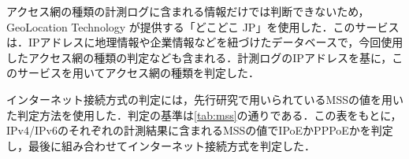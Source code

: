 アクセス網の種類の計測ログに含まれる情報だけでは判断できないため，GeoLocation Technology が提供する「どこどこ JP」を使用した．このサービスは．IPアドレスに地理情報や企業情報などを紐づけたデータベースで，今回使用したアクセス網の種類の判定なども含まれる．計測ログのIPアドレスを基に，このサービスを用いてアクセス網の種類を判定した．


インターネット接続方式の判定には，先行研究で用いられているMSSの値を用いた判定方法を使用した．判定の基準は\cref{tab:mss}の通りである．この表をもとに，IPv4/IPv6のそれぞれの計測結果に含まれるMSSの値でIPoEかPPPoEかを判定し，最後に組み合わせてインターネット接続方式を判定した．


